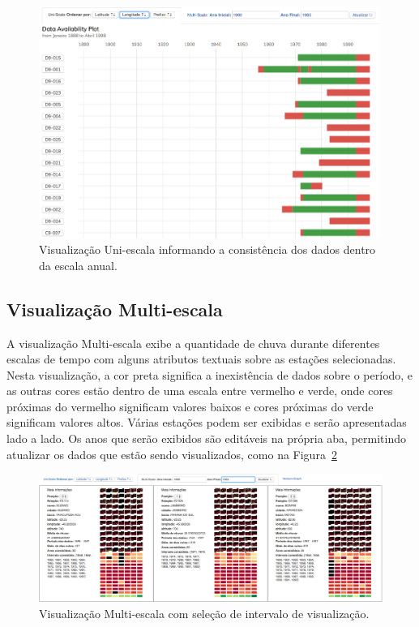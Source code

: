 \documentclass[article,11pt,oneside,a4paper]{abntex2} %
\begin{document}
	\begin{figure}[!h]
		\centering
		\includegraphics[width=0.99\textwidth]{figuras/uniescala02}
		\caption{Visualização Uni-escala informando a consistência dos dados dentro da escala anual.}
		\label{uniescala02}
	\end{figure}
	\newpage
	\subsection{Visualização Multi-escala}
	\hspace{13pt}
	A visualização Multi-escala exibe a quantidade de chuva durante diferentes escalas de tempo com alguns atributos textuais sobre as estações selecionadas. Nesta visualização, a cor preta significa a inexistência de dados sobre o período, e as outras cores estão dentro de uma escala entre vermelho e verde, onde cores próximas do vermelho significam valores baixos e cores próximas do verde significam valores altos. Várias estações podem ser exibidas e serão apresentadas lado a lado. Os anos que serão exibidos são editáveis na própria aba, permitindo atualizar os dados que estão sendo visualizados, como na Figura~\ref{multi_time}
	
	\begin{figure}[!htb]
	\centering
	\includegraphics[width=1\textwidth]{figuras/multi_time}
	\caption{Visualização Multi-escala com seleção de intervalo de visualização.}
	\label{multi_time}
	\end{figure}
\end{document}
